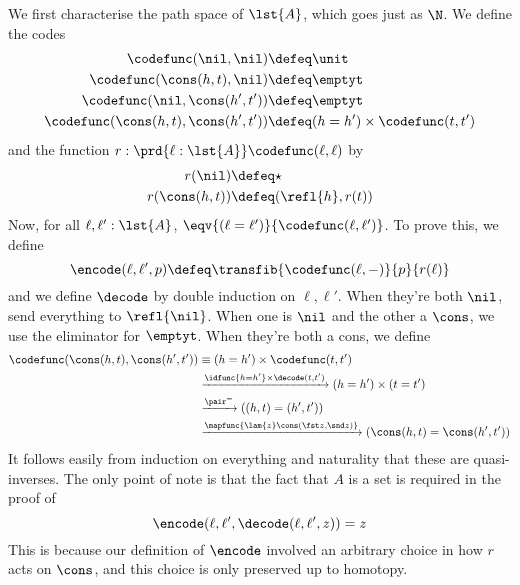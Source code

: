  \soln
We first characterise the path space of $\lst{A}$, which goes just as $\N$.
We define the codes
\begin{align*}
    \codefunc(\nil, \nil) &\defeq \unit \\
    \codefunc(\cons(h, t), \nil) &\defeq \emptyt \\
    \codefunc(\nil, \cons(h', t')) &\defeq \emptyt \\
    \codefunc(\cons(h, t), \cons(h', t')) &\defeq (h=h') \times \codefunc(t, t')
\end{align*}
and the function $r : \prd{\ell : \lst{A}} \codefunc(\ell, \ell)$ by
\begin{align*}
        r(\nil) &\defeq \star \\
        r(\cons(h, t)) &\defeq (\refl{h}, r(t))
\end{align*}
Now, for all $\ell, \ell' : \lst{A}$, $\eqv{(\ell = \ell')}{\codefunc(\ell,
\ell')}$.  To prove this, we define
\[
  \encode(\ell, \ell', p) \defeq \transfib{\codefunc(\ell, -)}{p}{r(\ell)}
\]
and we define $\decode$ by double induction on $\ell, \ell'$.  When they're
both $\nil$, send everything to $\refl{\nil}$.  When one is $\nil$ and the
other a $\cons$, we use the eliminator for $\emptyt$.  When they're both a
cons, we define
\begin{align*}
  \codefunc(\cons(h, t), \cons(h', t'))
  &\equiv
  (h = h') \times \codefunc(t, t') \\
  &\xrightarrow{\idfunc{h=h'} \times \decode(t, t')}
  (h = h') \times (t = t') \\
  &\xrightarrow{\pair^{=}}
  ((h, t) = (h', t')) \\
  &\xrightarrow{\mapfunc{\lam{z}\cons(\fst z, \snd z)}}
  (\cons(h, t) = \cons(h', t'))
\end{align*}
It follows easily from induction on everything and naturality that these are
quasi-inverses.  The only point of note is that the fact that $A$ is a set is
required in the proof of
\[
  \encode(\ell, \ell', \decode(\ell, \ell', z)) = z
\]
This is because our definition of $\encode$ involved an arbitrary choice in
how $r$ acts on $\cons$, and this choice is only preserved up to homotopy.
